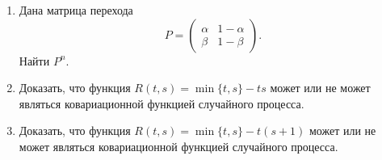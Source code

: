 \documentclass[a4paper,12pt]{extreport}
\renewcommand{\=}[1]{\stackrel{#1}{=}} %
\newcommand{\Proba}{\mathrm{P}}
\newcommand{\generaltime}{t \geqslant 0}
\newcommand{\newprocess}[1]{
    \ensuremath{
        #1 = \left(#1 _t\right)_{\generaltime}
    }
}
\begin{document}
\begin{enumerate}

    \item Дана матрица перехода 
    \[
    P = \begin{pmatrix}
    \alpha & 1-\alpha\\
    \beta & 1 - \beta
    \end{pmatrix}.
    \]
    Найти $P^n$.


    

    \item Доказать, что функция $R(t, s) = \min\{t, s\} - ts$
     может или не может являться ковариационной функцией случайного процесса.

    \item Доказать, что функция $R(t, s) = \min\{t, s\} - t(s + 1)$
     может или не может являться ковариационной функцией случайного процесса.



\end{enumerate}
\end{document}
